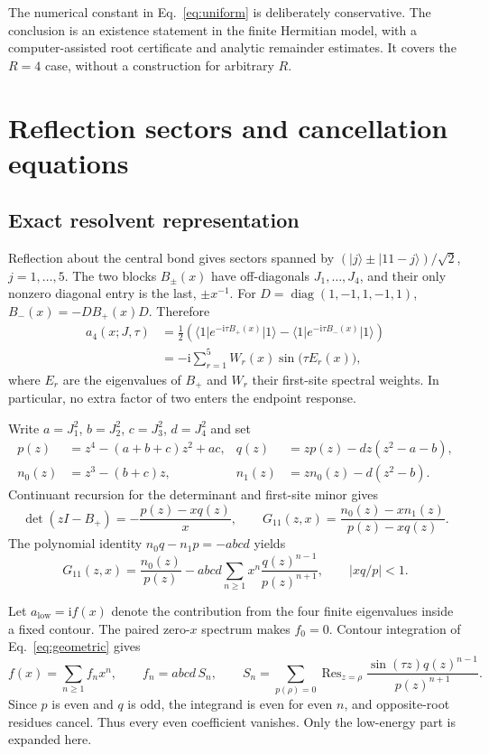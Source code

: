 \documentclass[11pt,a4paper]{article}
\newcommand{\ii}{\mathrm{i}}
\newcommand{\ket}[1]{\lvert #1\rangle}
\newcommand{\bra}[1]{\langle #1\rvert}
\newcommand{\Res}{\operatorname{Res}}
\numberwithin{equation}{section}
\begin{document}
The numerical constant in Eq.~\eqref{eq:uniform} is deliberately conservative.
The conclusion is an existence statement in the finite Hermitian model,
with a computer-assisted root certificate and analytic remainder estimates.
It covers the $R=4$ case, without a construction for arbitrary $R$.

\section{Reflection sectors and cancellation equations}
\subsection{Exact resolvent representation}
Reflection about the central bond gives sectors spanned by
$(\ket{j}\pm\ket{11-j})/\sqrt{2}$, $j=1,\ldots,5$.
The two blocks $B_\pm(x)$ have off-diagonals $J_1,\ldots,J_4$,
and their only nonzero diagonal entry is the last, $\pm x^{-1}$.
For $D=\operatorname{diag}(1,-1,1,-1,1)$,
$B_-(x)=-D B_+(x)D$. Therefore
\begin{align}
 a_4(x;J,\tau)
 &=\frac12\left(\bra{1}e^{-\ii\tau B_+(x)}\ket{1}
             -\bra{1}e^{-\ii\tau B_-(x)}\ket{1}\right)\nonumber\\
 &=-\ii\sum_{r=1}^{5}W_r(x)\sin\bigl(\tau E_r(x)\bigr),
 \label{eq:sectors}
\end{align}
where $E_r$ are the eigenvalues of $B_+$ and $W_r$ their first-site
spectral weights. In particular, no extra factor of two enters the endpoint
response.

Write $a=J_1^2$, $b=J_2^2$, $c=J_3^2$, $d=J_4^2$ and set
\begin{align}
 p(z)&=z^4-(a+b+c)z^2+ac,
 &q(z)&=zp(z)-dz(z^2-a-b),\nonumber\\
 n_0(z)&=z^3-(b+c)z,
 &n_1(z)&=zn_0(z)-d(z^2-b).
 \label{eq:polynomials}
\end{align}
Continuant recursion for the determinant and first-site minor gives
\begin{equation}
 \det(zI-B_+)=-\frac{p(z)-xq(z)}{x},\qquad
 G_{11}(z,x)=\frac{n_0(z)-xn_1(z)}{p(z)-xq(z)}.
 \label{eq:resolvent}
\end{equation}
The polynomial identity $n_0q-n_1p=-abcd$ yields
\begin{equation}
 G_{11}(z,x)=\frac{n_0(z)}{p(z)}
 -abcd\sum_{n\ge1}x^n\frac{q(z)^{n-1}}{p(z)^{n+1}},
 \qquad |xq/p|<1.
 \label{eq:geometric}
\end{equation}

Let $a_{\mathrm{low}}=\ii f(x)$ denote the contribution from the four
finite eigenvalues inside a fixed contour. The paired zero-$x$ spectrum
makes $f_0=0$. Contour integration of Eq.~\eqref{eq:geometric} gives
\begin{equation}
 f(x)=\sum_{n\ge1}f_nx^n,\qquad
 f_n=abcd\,S_n,\qquad
 S_n=\sum_{p(\rho)=0}\Res_{z=\rho}
       \frac{\sin(\tau z)q(z)^{n-1}}{p(z)^{n+1}}.
 \label{eq:coefficients}
\end{equation}
Since $p$ is even and $q$ is odd, the integrand is even for even $n$,
and opposite-root residues cancel. Thus every even coefficient vanishes.
Only the low-energy part is expanded here.
\end{document}

